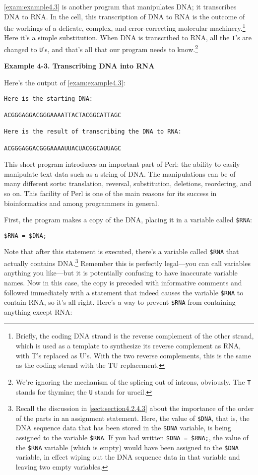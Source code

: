 \autoref{exam:example4.3} is another program that manipulates DNA; it transcribes DNA to RNA. In the cell, this transcription of DNA to RNA is the outcome of the workings of a delicate, complex, and error-correcting molecular machinery.\footnote{Briefly, the coding DNA strand is the reverse complement of the other strand, which is used as a template to synthesize its reverse complement as RNA, with T's replaced as U's. With the two reverse complements, this is the same as the coding strand with the TU replacement.} Here it's a simple substitution. When DNA is transcribed to RNA, all the \verb|T|'s are changed to \verb|U|'s, and that's all that our program needs to know.\footnote{We're ignoring the mechanism of the splicing out of introns, obviously. The \verb|T| stands for thymine; the \verb|U| stands for uracil.}

\textbf{Example 4-3. Transcribing DNA into RNA}



Here's the output of \autoref{exam:example4.3}:

\begin{lstlisting}
Here is the starting DNA:

ACGGGAGGACGGGAAAATTACTACGGCATTAGC

Here is the result of transcribing the DNA to RNA:

ACGGGAGGACGGGAAAAUUACUACGGCAUUAGC
\end{lstlisting}

This short program introduces an important part of Perl: the ability to easily manipulate text data such as a string of DNA. The manipulations can be of many different sorts: translation, reversal, substitution, deletions, reordering, and so on. This facility of Perl is one of the main reasons for its success in bioinformatics and among programmers in general.

First, the program makes a copy of the DNA, placing it in a variable called \verb|$RNA|:

\begin{lstlisting}
$RNA = $DNA;
\end{lstlisting}

Note that after this statement is executed, there's a variable called \verb|$RNA| that actually contains DNA.\footnote{Recall the discussion in \autoref{sect:section4.2.4.3} about the importance of the order of the parts in an assignment statement. Here, the value of \verb|$DNA|, that is, the DNA sequence data that has been stored in the \verb|$DNA| variable, is being assigned to the variable \verb|$RNA|. If you had written \verb|$DNA = $RNA;|, the value of the \verb|$RNA| variable (which is empty) would have been assigned to the \verb|$DNA| variable, in effect wiping out the DNA sequence data in that variable and leaving two empty variables.} Remember this is perfectly legal—you can call variables anything you like—but it is potentially confusing to have inaccurate variable names. Now in this case, the copy is preceded with informative comments and followed immediately with a statement that indeed causes the variable \verb|$RNA| to contain RNA, so it's all right. Here's a way to prevent \verb|$RNA| from containing anything except RNA: 

